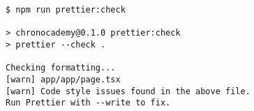 \begin{verbatim}
$ npm run prettier:check

> chronocademy@0.1.0 prettier:check
> prettier --check .

Checking formatting...
[warn] app/app/page.tsx
[warn] Code style issues found in the above file.
Run Prettier with --write to fix.
\end{verbatim}